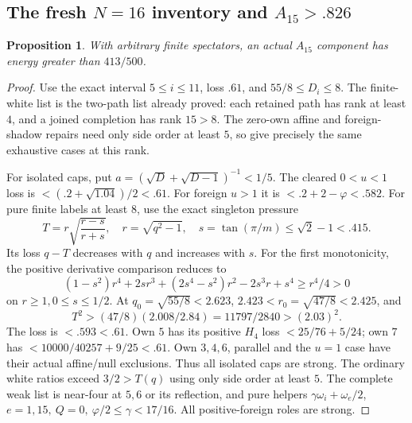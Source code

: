 \documentclass[11pt]{article}
\newtheorem{proposition}[theorem]{Proposition}
\theoremstyle{definition}
\theoremstyle{remark}
\begin{document}
\subsection[The fresh N=16 inventory and A15>.826]{The fresh \(N=16\) inventory and \(A_{15}>.826\)}
\label{app:A15}
\begin{proposition}
With arbitrary finite spectators, an actual \(A_{15}\)
component has energy greater than \(413/500\).
\end{proposition}
\begin{proof}
Use the exact interval \(5\leq i\leq11\), loss \(.61\),
and \(55/8\leq D_i\leq8\).
The finite-white list is the two-path list already
proved: each retained path has rank at least \(4\),
and a joined completion has rank \(15>8\).
The zero-own affine and foreign-shadow repairs need
only side order at least \(5\), so give precisely
the same exhaustive cases at this rank.

For isolated caps, put
\(a=(\sqrt D+\sqrt{D-1})^{-1}<1/5\).
The cleared \(0<u<1\) loss is
\(<(.2+\sqrt{1.04})/2<.61\).
For foreign \(u>1\) it is
\(<.2+2-\varphi<.582\).
For pure finite labels at least \(8\), use the
exact singleton pressure
\[
 T=r\sqrt{\frac{r-s}{r+s}},\quad
 r=\sqrt{q^2-1},\quad
 s=\tan(\pi/m)\leq\sqrt2-1<.415.
\]
Its loss \(q-T\) decreases with \(q\) and increases
with \(s\). For the first monotonicity, the
positive derivative comparison reduces to
\[
 (1-s^2)r^4+2sr^3+(2s^4-s^2)r^2-2s^3r+s^4
 \geq r^4/4>0
\]
on \(r\geq1,0\leq s\leq1/2\).
At \(q_0=\sqrt{55/8}<2.623\),
\(2.423<r_0=\sqrt{47/8}<2.425\), and
\[
 T^2>(47/8)(2.008/2.84)=11797/2840>(2.03)^2.
\]
The loss is \(<.593<.61\).
Own \(5\) has its positive \(H_4\) loss
\(<25/76+5/24\); own \(7\) has
\(<10000/40257+9/25<.61\).
Own \(3,4,6\), parallel and the \(u=1\)
case have their actual affine/null exclusions.
Thus all isolated caps are strong.
The ordinary white ratios exceed \(3/2>T(q)\)
using only side order at least \(5\).
The complete weak list is near-four at \(5,6\)
or its reflection, and pure helpers
\(\gamma\omega_i+\omega_e/2\),
\(e=1,15,\ Q=0,\ \varphi/2\leq\gamma<17/16\).
All positive-foreign roles are strong.


\end{proof}
\end{document}

